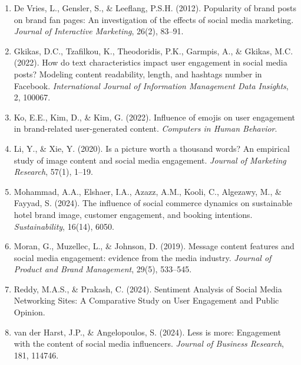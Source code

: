 \documentclass[12pt,a4paper]{article}
\begin{document}
\begin{enumerate}
    \item De Vries, L., Gensler, S., \& Leeflang, P.S.H. (2012). Popularity of brand posts on brand fan pages: An investigation of the effects of social media marketing. \textit{Journal of Interactive Marketing}, 26(2), 83--91.

    \item Gkikas, D.C., Tzafilkou, K., Theodoridis, P.K., Garmpis, A., \& Gkikas, M.C. (2022). How do text characteristics impact user engagement in social media posts? Modeling content readability, length, and hashtags number in Facebook. \textit{International Journal of Information Management Data Insights}, 2, 100067.

    \item Ko, E.E., Kim, D., \& Kim, G. (2022). Influence of emojis on user engagement in brand-related user-generated content. \textit{Computers in Human Behavior}.

    \item Li, Y., \& Xie, Y. (2020). Is a picture worth a thousand words? An empirical study of image content and social media engagement. \textit{Journal of Marketing Research}, 57(1), 1--19.

    \item Mohammad, A.A., Elshaer, I.A., Azazz, A.M., Kooli, C., Algezawy, M., \& Fayyad, S. (2024). The influence of social commerce dynamics on sustainable hotel brand image, customer engagement, and booking intentions. \textit{Sustainability}, 16(14), 6050.

    \item Moran, G., Muzellec, L., \& Johnson, D. (2019). Message content features and social media engagement: evidence from the media industry. \textit{Journal of Product and Brand Management}, 29(5), 533--545.

    \item Reddy, M.A.S., \& Prakash, C. (2024). Sentiment Analysis of Social Media Networking Sites: A Comparative Study on User Engagement and Public Opinion.

    \item van der Harst, J.P., \& Angelopoulos, S. (2024). Less is more: Engagement with the content of social media influencers. \textit{Journal of Business Research}, 181, 114746.
\end{enumerate}
\end{document}
